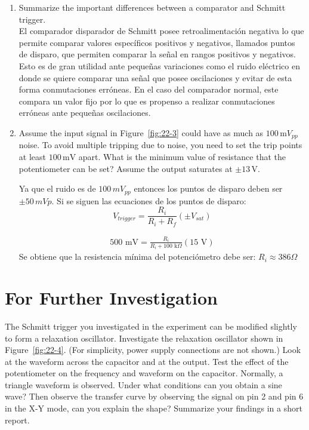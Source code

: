 \documentclass[11pt]{article}
\begin{document}
\begin{enumerate}[label=\arabic*.]
    \item Summarize the important differences between a comparator and Schmitt trigger.\\
	El comparador disparador de Schmitt posee retroalimentación negativa lo que permite comparar valores específicos positivos y negativos, llamados puntos de disparo, que permiten comparar la señal en rangos positivos y negativos. Esto es de gran utilidad ante pequeñas variaciones como el ruido eléctrico en donde se quiere comparar una señal que posee oscilaciones y evitar de esta forma conmutaciones erróneas. En el caso del comparador normal, este compara un valor fijo por lo que es propenso a realizar conmutaciones erróneas ante pequeñas oscilaciones.
	
	
    \vspace{0.5cm}

    \item Assume the input signal in Figure~\ref{fig:22-3} could have as much as $100\,\text{m}V_{pp}$ noise. To avoid multiple tripping due to noise, you need to set the trip points at least $100\,\text{mV}$ apart. What is the minimum value of resistance that the potentiometer can be set? Assume the output saturates at $\pm 13\,\text{V}$.
    
    Ya que el ruido es de $100\, mV_{pp}$ entonces los puntos de disparo deben ser $\pm 50\, mVp$.
    Si se siguen las ecuaciones de los puntos de disparo:
    \begin{equation}
    	V_{trigger} = \frac{R_i}{R_i + R_f} (\pm V_{sat})
    \end{equation}
    
    \begin{align*}
    	500\text{ mV} = \frac{R_i}{R_i + 100\text{ k}\Omega}(15\text{ V})
    \end{align*}
    Se obtiene que la resistencia mínima del potenciómetro debe ser:
    $R_i \approx 386 \Omega$
    
    

    \vspace{2.5cm}
\end{enumerate}

\section*{For Further Investigation}

The Schmitt trigger you investigated in the experiment can be modified slightly to form a relaxation oscillator. Investigate the relaxation oscillator shown in Figure~\ref{fig:22-4}. (For simplicity, power supply connections are not shown.) Look at the waveform across the capacitor and at the output. Test the effect of the potentiometer on the frequency and waveform on the capacitor. Normally, a triangle waveform is observed. Under what conditions can you obtain a sine wave? Then observe the transfer curve by observing the signal on pin 2 and pin 6 in the X-Y mode, can you explain the shape? Summarize your findings in a short report.
\end{document}
